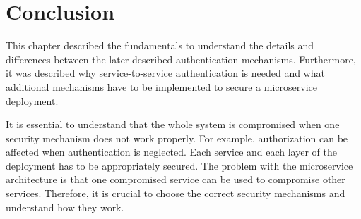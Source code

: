 \section{Conclusion}
This chapter described the fundamentals to understand the details and differences between the later described authentication mechanisms.
Furthermore, it was described why service-to-service authentication is needed and what additional mechanisms have to be implemented to secure a microservice deployment.

It is essential to understand that the whole system is compromised when one security mechanism does not work properly.
For example, authorization can be affected when authentication is neglected.
Each service and each layer of the deployment has to be appropriately secured.
The problem with the microservice architecture is that one compromised service can be used to compromise other services.
Therefore, it is crucial to choose the correct security mechanisms and understand how they work. 
